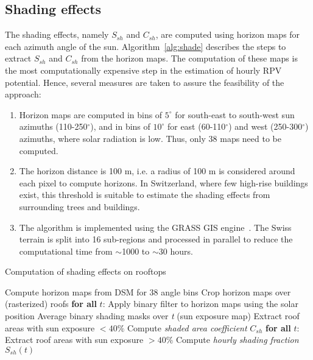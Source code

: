 \subsection*{Shading effects}
\label{app:shade}

The shading effects, namely $S_{sh}$ and $C_{sh}$, are computed using horizon maps for each azimuth angle of the sun. Algorithm~\ref{alg:shade} describes the steps to extract $S_{sh}$ and $C_{sh}$ from the horizon maps.
The computation of these maps is the most computationally expensive step in the estimation of hourly RPV potential. Hence, several measures are taken to assure the feasibility of the approach:

\begin{enumerate}
    \item Horizon maps are computed in bins of $5^\circ$ for south-east to south-west sun azimuths (110-250$^\circ$), and in bins of $10^\circ$ for east (60-110$^\circ$) and west (250-300$^\circ$) azimuths, where solar radiation is low. Thus, only 38 maps need to be computed.
    \item The horizon distance is 100 m, i.e. a radius of 100 m is considered around each pixel to compute horizons. In Switzerland, where few high-rise buildings exist, this threshold is suitable to estimate the shading effects from surrounding trees and buildings.
    \item The algorithm is implemented using the GRASS GIS engine~\cite{neteler_grass_2012}. The Swiss terrain is split into 16 sub-regions and processed in parallel to reduce the computational time from $\sim$1000 to $\sim$30 hours. 
    
\end{enumerate}

\begin{algorithm}[htbp]
\caption{Computation of shading effects on rooftops}
\label{alg:shade}
\begin{algorithmic}[1]
  \footnotesize
  \State Compute horizon maps from DSM for 38 angle bins
  \State Crop horizon maps over (rasterized) roofs
  \Statex \textbf{for all} $t$:
    \State \qquad Apply binary filter to horizon maps using the solar position
  \State Average binary shading masks over \textit{t} (sun exposure map)
  \State Extract roof areas with sun exposure $< 40\%$
  \State Compute \textit{shaded area coefficient} $C_{sh}$
  \Statex \textbf{for all} $t$:
  	\State \qquad Extract roof areas with sun exposure $> 40\%$
    \State \qquad Compute \textit{hourly shading fraction} $S_{sh}(t)$
\end{algorithmic}
\end{algorithm}

